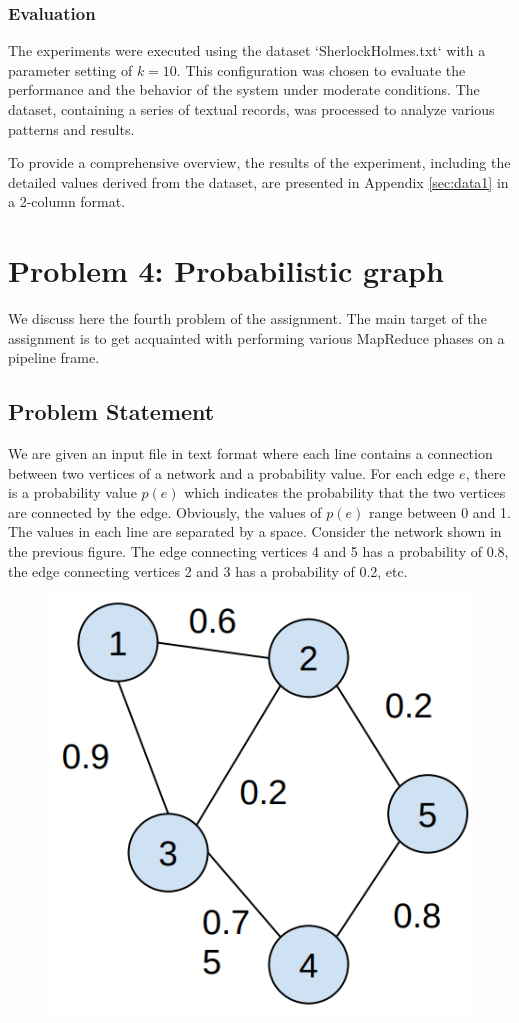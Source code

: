 \documentclass[acmlarge]{acmart}
\begin{document}
\subsubsection{Evaluation}
The experiments were executed using the dataset `SherlockHolmes.txt` with a parameter setting of \( k = 10 \).
This configuration was chosen to evaluate the performance and the behavior of the system under moderate conditions.
The dataset, containing a series of textual records, was processed to analyze various patterns and results.

To provide a comprehensive overview, the results of the experiment, including the detailed values derived from the
dataset, are presented in Appendix \ref{sec:data1} in a 2-column format.


\section{Problem 4: Probabilistic graph}
\label{sec:problem4}
We discuss here the fourth problem of the assignment.
The main target of the assignment is to get acquainted with performing various MapReduce phases on a pipeline frame.

\subsection{Problem Statement}
We are given an input file in text format where each line contains a connection between two vertices of a network and a
probability value.
For each edge \( e \), there is a probability value \( p(e) \) which indicates the probability that the two vertices are
connected by the edge.
Obviously, the values of \( p(e) \) range between 0 and 1.
The values in each line are separated by a space.
Consider the network shown in the previous figure.
The edge connecting vertices 4 and 5 has a probability of
0.8, the edge connecting vertices 2 and 3 has a probability of 0.2, etc.

\begin{figure}[h]
  \centering
  \includegraphics[width=0.25\linewidth]{figures/graph}
\end{figure}
\end{document}
